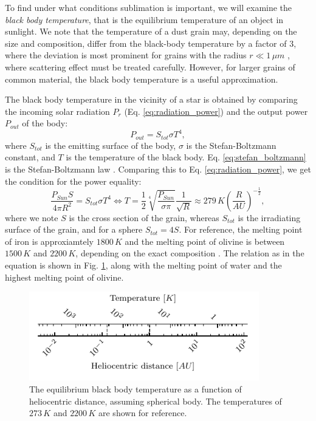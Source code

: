 To find under what conditions sublimation is important, we will examine the \textit{black body temperature}, that is the equilibrium temperature of an object in sunlight. We note that the temperature of a dust grain may, depending on the size and composition, differ from the black-body temperature by a factor of $3$, where the deviation is most prominent for grains with the radius $r \ll 1 \, \si{\mu m}$ \citep{myrvang2018temperature}, where scattering effect must be treated carefully. However, for larger grains of common material, the black body temperature is a useful approximation. 

The black body temperature in the vicinity of a star is obtained by comparing the incoming solar radiation $P_{r}$ (Eq. \ref{eq:radiation_power}) and the output power $P_{out}$ of the body:
\begin{equation}
    P_{out} = S_{tot} \sigma T^4,
    \label{eq:stefan_boltzmann}
\end{equation}
where $S_{tot}$ is the emitting surface of the body, $\sigma$ is the Stefan-Boltzmann constant, and $T$ is the temperature of the black body. Eq. \ref{eq:stefan_boltzmann} is the Stefan-Boltzmann law \citep{stefan1879uber,boltzmann1884ableitnung}. Comparing this to Eq. \ref{eq:radiation_power}, we get the condition for the power equality:
\begin{equation}
    \frac{P_{Sun} S}{4 \pi R^2} = S_{tot} \sigma T^4 \Leftrightarrow T =  \frac{1}{2} \sqrt[4]{\frac{P_{Sun}}{\sigma \pi}} \frac{1}{\sqrt{R}} \approx 279 \, \si{K} \left(\frac{R}{\si{AU}}\right)^{-\frac{1}{2}}, 
\end{equation}
where we note $S$ is the cross section of the grain, whereas $S_{tot}$ is the irradiating surface of the grain, and for a sphere $S_{tot} = 4S$. For reference, the melting point of iron is approxiamtely $1800 \, \si{K}$ and the melting point of olivine is between $1500 \, \si{K}$ and $2200 \, \si{K}$, depending on the exact composition \citep{liu1975melting,pinti2015olivine}. The relation as in the equation is shown in Fig. \ref{fig:black_body_temperature}, along with the melting point of water and the highest melting point of olivine.

\begin{figure}[h]
 	\centering
 	\includegraphics[width=10cm]{figures/distance_temperature_ruler.pdf}
 	\caption{The equilibrium black body temperature as a function of heliocentric distance, assuming spherical body. The temperatures of $273 \, \si{K}$ and $2200 \, \si{K}$ are shown for reference.}
 	\label{fig:black_body_temperature}
\end{figure}

